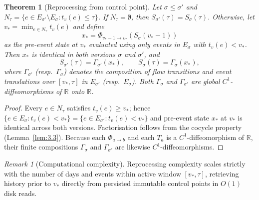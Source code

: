 \documentclass[11pt, a4paper]{article}
\theoremstyle{definition}
\theoremstyle{plain}
\newtheorem{teorema}[definicao]{Theorem}
\theoremstyle{remark}
\newtheorem{observacao}[definicao]{Remark}
\begin{document}
\begin{teorema}[Reprocessing from control point]\label{teo:4.3}
Let $\sigma \le \sigma'$ and $N_\tau = \{e \in E_{\sigma'} \setminus E_\sigma : t_v(e) \le \tau\}$. If $N_\tau = \emptyset$, then $S_{\sigma'}(\tau) = S_\sigma(\tau)$. Otherwise, let $v_* = \min_{e \in N_\tau} t_v(e)$ and define
\[
x_* = \Phi_{v_* - 1 \to v_*}(S_\sigma(v_* - 1))
\]
as the pre-event state at $v_*$ evaluated using only events in $E_\sigma$ with $t_v(e) < v_*$. Then $x_*$ is identical in both versions $\sigma$ and $\sigma'$, and
\[
S_{\sigma'}(\tau) = \Gamma_{\sigma'}(x_*), \qquad S_\sigma(\tau) = \Gamma_\sigma(x_*),
\]
where $\Gamma_{\sigma'}$ (resp.\ $\Gamma_\sigma$) denotes the composition of flow transitions and event translations over $[v_*, \tau]$ in $E_{\sigma'}$ (resp.\ $E_\sigma$). Both $\Gamma_\sigma$ and $\Gamma_{\sigma'}$ are global $C^1$-diffeomorphisms of $\mathbb{R}$ onto $\mathbb{R}$.
\end{teorema}
\begin{proof}
Every $e \in N_\tau$ satisfies $t_v(e) \ge v_*$; hence $\{e \in E_\sigma : t_v(e) < v_*\} = \{e \in E_{\sigma'} : t_v(e) < v_*\}$ and pre-event state $x_*$ at $v_*$ is identical across both versions. Factorisation follows from the cocycle property (Lemma~\ref{lem:3.3}). Because each $\Phi_{a \to b}$ and each $T_a$ is a $C^1$-diffeomorphism of $\mathbb{R}$, their finite compositions $\Gamma_\sigma$ and $\Gamma_{\sigma'}$ are likewise $C^1$-diffeomorphisms.
\end{proof}

\begin{observacao}[Computational complexity]\label{obs:4.4}
Reprocessing complexity scales strictly with the number of days and events within active window $[v_*, \tau]$, retrieving history prior to $v_*$ directly from persisted immutable control points in $O(1)$ disk reads.
\end{observacao}
\end{document}
